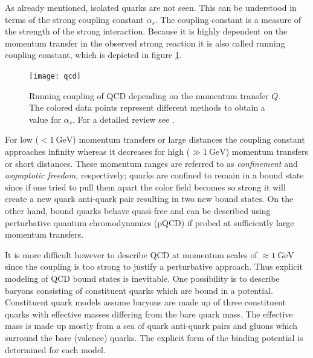  As already mentioned, isolated quarks are not seen. This can be understood in terms of the strong coupling constant $\alpha_s$. The coupling constant is a measure of the strength of the strong interaction. Because it is highly dependent on the momentum transfer in the observed strong reaction it is also called running coupling constant, which is depicted in figure \ref{fig:coupl}.
 \begin{figure}
 	\centering
 	\texttt{[image: qcd]}
 	\caption{Running coupling of QCD depending on the momentum transfer $Q$. The colored data points represent different methods to obtain a value for $\alpha_s$. For a detailed review see \cite{pdg}.}
 	\label{fig:coupl}
 \end{figure}

 For low ($<\SI{1}{\GeV}$) momentum transfers or large distances the coupling constant approaches infinity whereas it decreases for high ($\gg\SI{1}{\GeV}$) momentum transfers or short distances. These momentum ranges are referred to as \emph{confinement} and \emph{asymptotic freedom}, respectively; quarks are confined to remain in a bound state since if one tried to pull them apart the color field becomes so strong it will create a new quark anti-quark pair resulting in two new bound states. On the other hand, bound quarks behave quasi-free and can be described using perturbative quantum chromodynamics (pQCD) if probed at sufficiently large momentum transfers.

 It is more difficult however to describe QCD at momentum scales of $\approx \SI{1}{\GeV}$ since the coupling is too strong to justify a perturbative approach. Thus explicit modeling of QCD bound states is inevitable. One possibility is to describe baryons consisting of constituent quarks which are bound in a potential. Constituent quark models assume baryons are made up of three constituent quarks with effective masses differing from the bare quark mass. The effective mass is made up mostly from a sea of quark anti-quark pairs and gluons which surround the bare (valence) quarks. The explicit form of the binding potential is determined for each model.

